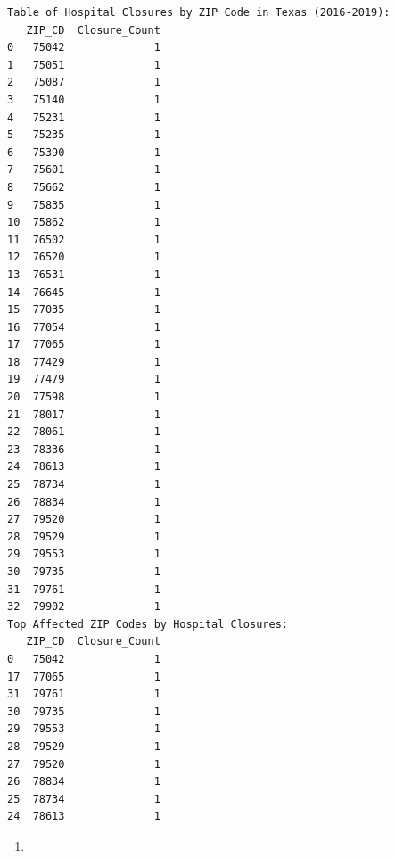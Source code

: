 \documentclass[
  letterpaper,
  DIV=11,
  numbers=noendperiod]{scrartcl}
\providecommand{\tightlist}{%
  \setlength{\itemsep}{0pt}\setlength{\parskip}{0pt}}\usepackage{longtable,booktabs,array}
\begin{document}
\begin{verbatim}
Table of Hospital Closures by ZIP Code in Texas (2016-2019):
   ZIP_CD  Closure_Count
0   75042              1
1   75051              1
2   75087              1
3   75140              1
4   75231              1
5   75235              1
6   75390              1
7   75601              1
8   75662              1
9   75835              1
10  75862              1
11  76502              1
12  76520              1
13  76531              1
14  76645              1
15  77035              1
16  77054              1
17  77065              1
18  77429              1
19  77479              1
20  77598              1
21  78017              1
22  78061              1
23  78336              1
24  78613              1
25  78734              1
26  78834              1
27  79520              1
28  79529              1
29  79553              1
30  79735              1
31  79761              1
32  79902              1
Top Affected ZIP Codes by Hospital Closures:
   ZIP_CD  Closure_Count
0   75042              1
17  77065              1
31  79761              1
30  79735              1
29  79553              1
28  79529              1
27  79520              1
26  78834              1
25  78734              1
24  78613              1
\end{verbatim}

\begin{enumerate}
\def\labelenumi{\arabic{enumi}.}
\setcounter{enumi}{1}
\tightlist
\item
\end{enumerate}
\end{document}
